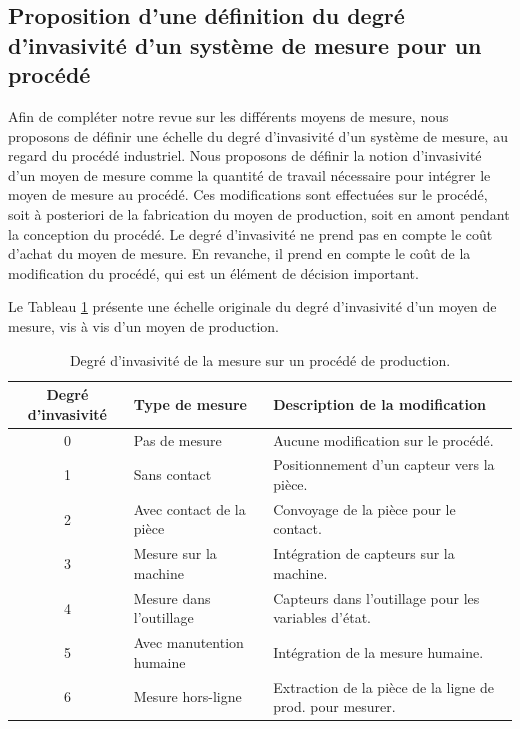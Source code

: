 \subsection{Proposition d'une définition du degré d'invasivité d'un système de mesure pour un procédé}
Afin de compléter notre revue sur les différents moyens de mesure, nous proposons de définir une échelle du degré d'invasivité d'un système de mesure, au regard du procédé industriel.
Nous proposons de définir la notion d'invasivité d'un moyen de mesure comme la quantité de travail nécessaire pour intégrer le moyen de mesure au procédé.
Ces modifications sont effectuées sur le procédé, soit à posteriori de la fabrication du moyen de production, soit en amont pendant la conception du procédé.
Le degré d'invasivité ne prend pas en compte le coût d'achat du moyen de mesure.
En revanche, il prend en compte le coût de la modification du procédé, qui est un élément de décision important.

Le Tableau \ref{tab:measure_invasivity} présente une échelle originale du degré d'invasivité d'un moyen de mesure, vis à vis d'un moyen de production.

\begin{table}[htbp]
	\hspace*{-5mm}
	\begin{tabular}{|c|l|l|}
		\arrayrulecolor{black}
		\hline
		Degré d'invasivité & Type de mesure & Description de la modification \\
		\hline \hline
		0 & Pas de mesure & Aucune modification sur le procédé. \\ \hline
		1 & Sans contact & Positionnement d'un capteur vers la pièce. \\ \hline
		2 & Avec contact de la pièce & Convoyage de la pièce pour le contact. \\ \hline
		3 & Mesure sur la machine & Intégration de capteurs sur la machine.  \\ \hline
		4 & Mesure dans l'outillage & Capteurs dans l'outillage pour les variables d'état. \\ \hline
		5 & Avec manutention humaine & Intégration de la mesure humaine. \\ \hline
		6 & Mesure hors-ligne & Extraction de la pièce de la ligne de prod. pour mesurer. \\ \hline
	\end{tabular}
	\caption{Degré d'invasivité de la mesure sur un procédé de production.}
	\label{tab:measure_invasivity}
\end{table}

